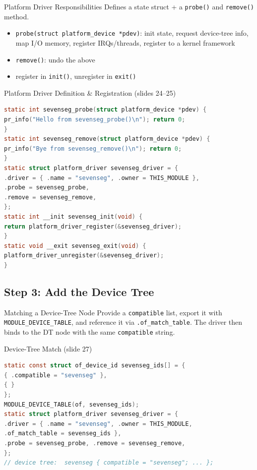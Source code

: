 \begin{definition}{Platform Driver Responsibilities}
    Defines a state struct + a \texttt{probe()} and \texttt{remove()} method.
    \begin{itemize}
        \item \texttt{probe(struct platform\_device *pdev)}: init state, request
              device-tree info, map I/O memory, register IRQs/threads, register to a
              kernel framework
        \item \texttt{remove()}: undo the above
        \item register in \texttt{init()}, unregister in \texttt{exit()}
    \end{itemize}
\end{definition}

\begin{examplecode}{Platform Driver Definition \& Registration (slides 24--25)}
\begin{lstlisting}[language=C, style=basesmol, aboveskip=2pt, belowskip=2pt]
static int sevenseg_probe(struct platform_device *pdev) {
pr_info("Hello from sevenseg_probe()\n"); return 0;
}
static int sevenseg_remove(struct platform_device *pdev) {
pr_info("Bye from sevenseg_remove()\n"); return 0;
}
static struct platform_driver sevenseg_driver = {
.driver = { .name = "sevenseg", .owner = THIS_MODULE },
.probe = sevenseg_probe,
.remove = sevenseg_remove,
};
static int __init sevenseg_init(void) {
return platform_driver_register(&sevenseg_driver);
}
static void __exit sevenseg_exit(void) {
platform_driver_unregister(&sevenseg_driver);
}
\end{lstlisting}
\end{examplecode}

\subsection{Step 3: Add the Device Tree}

\begin{definition}{Matching a Device-Tree Node}
    Provide a \texttt{compatible} list, export it with \texttt{MODULE\_DEVICE\_TABLE},
    and reference it via \texttt{.of\_match\_table}. The driver then binds to the DT
    node with the same \texttt{compatible} string.
\end{definition}

\begin{examplecode}{Device-Tree Match (slide 27)}
\begin{lstlisting}[language=C, style=basesmol, aboveskip=2pt, belowskip=2pt]
static const struct of_device_id sevenseg_ids[] = {
{ .compatible = "sevenseg" },
{ }
};
MODULE_DEVICE_TABLE(of, sevenseg_ids);
static struct platform_driver sevenseg_driver = {
.driver = { .name = "sevenseg", .owner = THIS_MODULE,
.of_match_table = sevenseg_ids },
.probe = sevenseg_probe, .remove = sevenseg_remove,
};
// device tree:  sevenseg { compatible = "sevenseg"; ... };
\end{lstlisting}
\end{examplecode}

